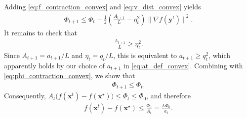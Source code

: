 \documentclass{article}
\theoremstyle{plain}
\theoremstyle{definition}
\theoremstyle{remark}
\begin{document}
Adding \eqref{eq:f_contraction_convex} and \eqref{eq:v_dist_convex} yields
\begin{align}\label{eq:phi_contraction_convex}
\Phi_{t+1}
\le
\Phi_t
-
\frac12
\left(
\frac{A_{t+1}}{L}-\eta_t^2
\right)
\|\nabla f(\mathbf{y}^{t})\|^2.
\end{align}
It remains to check that
\begin{align}
\frac{A_{t+1}}{L}\ge \eta_t^2.
\end{align}
Since \(A_{t+1}=a_{t+1}/L\) and \(\eta_t=q_t/L\), this is equivalent to
$a_{t+1}\ge q_t^2$, which apparently holds by our choice of $a_{t+1}$ in \eqref{eq:at_def_convex}. Combining with \eqref{eq:phi_contraction_convex}, we show that
\begin{align}
\Phi_{t+1}\le \Phi_t.
\end{align}
Consequently,
$
A_t\bigl(f(\mathbf{x}^{t})-f(\mathbf{x}^\star)\bigr)
\le
\Phi_t
\le
\Phi_0
$, and therefore
\begin{align}\label{eq:f_bound_convex}
f(\mathbf{x}^{t})-f(\mathbf{x}^\star)
\le
\frac{\Phi_0}{A_t}
=
\frac{L\Phi_0}{a_t}.
\end{align}
\end{document}
